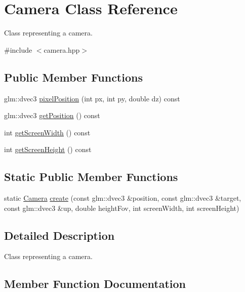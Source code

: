 \hypertarget{class_camera}{}\section{Camera Class Reference}
\label{class_camera}


Class representing a camera.  




{\ttfamily \#include $<$camera.\+hpp$>$}

\subsection*{Public Member Functions}
\begin{DoxyCompactItemize}
\item 
glm\+::dvec3 \hyperlink{class_camera_a8fd5bf11217034ce0f64e298f87dad60}{pixel\+Position} (int px, int py, double dz) const 
\item 
glm\+::dvec3 \hyperlink{class_camera_ae6d3cad7a69868bcc9ba1fd6a0350254}{get\+Position} () const 
\item 
int \hyperlink{class_camera_a220935f09adabbfa85511c799dbfb2b9}{get\+Screen\+Width} () const 
\item 
int \hyperlink{class_camera_a0448708fe31e35eb3f6413b1378143d8}{get\+Screen\+Height} () const 
\end{DoxyCompactItemize}
\subsection*{Static Public Member Functions}
\begin{DoxyCompactItemize}
\item 
static \hyperlink{class_camera}{Camera} \hyperlink{class_camera_ad396e8d09bbd305d055857806048ffc7}{create} (const glm\+::dvec3 \&position, const glm\+::dvec3 \&target, const glm\+::dvec3 \&up, double height\+Fov, int screen\+Width, int screen\+Height)
\end{DoxyCompactItemize}


\subsection{Detailed Description}
Class representing a camera. 

\subsection{Member Function Documentation}
